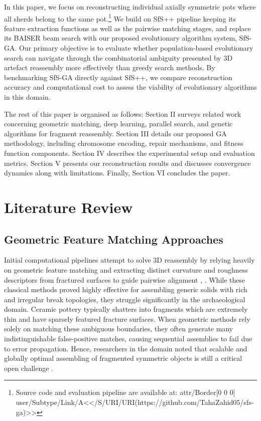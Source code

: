 \documentclass[conference]{IEEEtran}
\newcommand{\hreflink}[2]{\leavevmode\pdfstartlink attr{/Border[0 0 0]} user{/Subtype/Link/A<</S/URI/URI(#1)>>}\relax{#2}\pdfendlink}
\begin{document}
In this paper, we focus on reconstructing individual axially symmetric pots where all sherds belong to the same pot.\footnote{Source code and evaluation pipeline are available at: \hreflink{https://github.com/TahaZahid05/sfs-ga}{\url{https://github.com/TahaZahid05/sfs-ga}}} We build on SfS++ pipeline keeping its feature extraction functions as well as the pairwise matching stages, and replace its BAISER beam search with our proposed evolutionary algorithm system, SfS-GA. Our primary objective is to evaluate whether population-based evolutionary search can navigate through the combinatorial ambiguity presented by 3D artefact reassembly more effectively than greedy search methods. By benchmarking SfS-GA directly against SfS++, we compare reconstruction accuracy and computational cost to assess the viability of evolutionary algorithms in this domain.

The rest of this paper is organised as follows: Section II surveys related work concerning geometric matching, deep learning, parallel search, and genetic algorithms for fragment reassembly. Section III details our proposed GA methodology, including chromosome encoding, repair mechanisms, and fitness function components. Section IV describes the experimental setup and evaluation metrics. Section V presents our reconstruction results and discusses convergence dynamics along with limitations. Finally, Section VI concludes the paper.

\section{Literature Review}
\subsection{Geometric Feature Matching Approaches}
Initial computational pipelines attempt to solve 3D reassembly by relying heavily on geometric feature matching and extracting distinct curvature and roughness descriptors from fractured surfaces to guide pairwise alignment \cite{b4}, \cite{b5}. While these classical methods proved highly effective for assembling generic solids with rich and irregular break topologies, they struggle significantly in the archaeological domain. Ceramic pottery typically shatters into fragments which are extremely thin and have sparsely featured fracture surfaces. When geometric methods rely solely on matching these ambiguous boundaries, they often generate many indistinguishable false-positive matches, causing sequential assemblies to fail due to error propagation. Hence, researchers in the domain noted that scalable and globally optimal assembling of fragmented symmetric objects is still a critical open challenge \cite{b8}.
\end{document}
